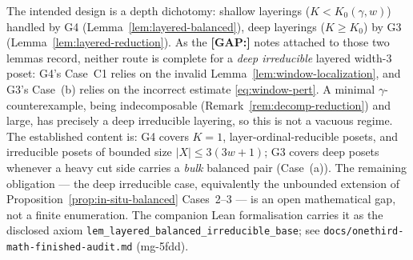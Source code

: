 \begin{remark}\label{rem:g3-g4-interface}
The intended design is a depth dichotomy: shallow layerings
($K < K_0(\gamma,w)$) handled by G4
(Lemma~\ref{lem:layered-balanced}), deep layerings
($K \ge K_0$) by G3 (Lemma~\ref{lem:layered-reduction}). As the
\textbf{[GAP:]} notes attached to those two lemmas record, neither
route is complete for a \emph{deep irreducible} layered width-$3$
poset: G4's Case~C1 relies on the invalid
Lemma~\ref{lem:window-localization}, and G3's Case~(b) relies on the
incorrect estimate \eqref{eq:window-pert}. A minimal
$\gamma$-counter\-example, being indecomposable
(Remark~\ref{rem:decomp-reduction}) and large, has precisely a deep
irreducible layering, so this is not a vacuous regime. The
established content is: G4 covers $K = 1$, layer-ordinal-reducible
posets, and irreducible posets of bounded size $|X| \le 3(3w+1)$; G3
covers deep posets whenever a heavy cut side carries a
\emph{bulk} balanced pair (Case~(a)). The remaining obligation --- the
deep irreducible case, equivalently the unbounded extension of
Proposition~\ref{prop:in-situ-balanced} Cases~2--3 --- is an open
mathematical gap, not a finite enumeration. The companion Lean
formalisation carries it as the disclosed axiom
\texttt{lem\_layered\_balanced\_irreducible\_base}; see
\texttt{docs/onethird-math-finished-audit.md} (mg-5fdd).
\end{remark}

